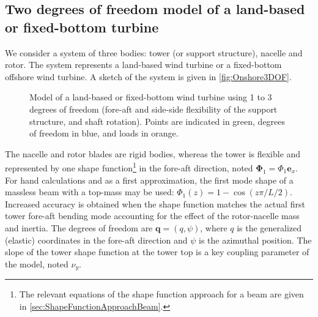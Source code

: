 \documentclass[wes, manuscript]{copernicus}
\renewcommand{\v}[1]{\boldsymbol{#1}}
\begin{document}




\subsection{Two degrees of freedom model of a land-based or fixed-bottom turbine}
\label{sec:Onshore1DOF}\label{sec:Onshore2DOF}
We consider a system of three bodies: tower (or support structure), nacelle and rotor.
The system represents a land-based wind turbine or a fixed-bottom offshore wind turbine. 
A sketch of the system is given in \autoref{fig:Onshore3DOF}. 
\begin{figure}[!htb]%
 \centering%
 \def\svgwidth{0.6\columnwidth}%
 \caption{Model of a land-based or fixed-bottom wind turbine using 1 to 3 degrees of freedom (fore-aft and side-side flexibility of the support structure, and shaft rotation). Points are indicated in green, degrees of freedom in blue, and loads in orange.}\label{fig:Onshore3DOF}%
 \end{figure}%
The nacelle and rotor blades are rigid bodies, whereas the tower is flexible and represented by one shape function\footnote{
The relevant equations of the shape function approach for a beam are given in \autoref{sec:ShapeFunctionApproachBeam}.} in the fore-aft direction, noted $\v{\Phi}_1=\Phi_1 \v{e}_x$.
For hand calculations and as a first approximation, the first mode shape of a massless beam with a top-mass may be used: $\Phi_1(z)=1-\cos(z\pi/L/2)$.
Increased accuracy is obtained when the shape function matches the actual first tower fore-aft bending mode accounting for the effect of the rotor-nacelle mass and inertia.
    The degrees of freedom are $\v{q}=(q, \psi)$, where $q$ is the generalized (elastic) coordinates in the fore-aft direction and $\psi$ is the azimuthal position.
The slope of the tower shape function at the tower top is a key coupling parameter of the model, noted  $\nu_y$.
\end{document}
